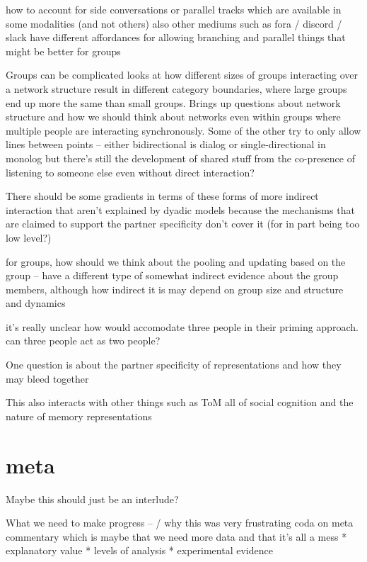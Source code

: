 \documentclass[]{article}
\begin{document}
how to account for side conversations or parallel tracks which are available in some modalities (and not others) also other mediums such as fora / discord / slack have different affordances for allowing branching and parallel things that might be better for groups 

Groups can be complicated \cite{guilbeault2021} looks at how different sizes of groups interacting over a network structure result in different category boundaries, where large groups end up more the same than small groups. Brings up questions about network structure and how we should think about networks even within groups where multiple people are interacting synchronously. Some of the other try to only allow lines between points -- either bidirectional is dialog or single-directional in monolog but there's still the development of shared stuff from the co-presence of listening to someone else even without direct interaction? 

There should be some gradients in terms of these forms of more indirect interaction that aren't explained by dyadic models because the mechanisms that are claimed to support the partner specificity don't cover it (for in part being too low level?)

\cite{hawkins2021} for groups, how should we think about the pooling and updating based on the group -- have a different type of somewhat indirect evidence about the group members, although how indirect it is may depend on group size and structure and dynamics 

it's really unclear how \cite{pickering2004} would accomodate three people in their priming approach. can three people act as two people? 


One question is about the partner specificity of representations and how they may bleed together

This also interacts with other things such as ToM all of social cognition and the nature of memory representations 



\section{meta}

Maybe this should just be an interlude? 

What we need to make progress -- / why this was very frustrating 
coda on meta commentary which is maybe that we need more data and that it's all a mess 
* explanatory value
* levels of analysis
* experimental evidence
\end{document}
